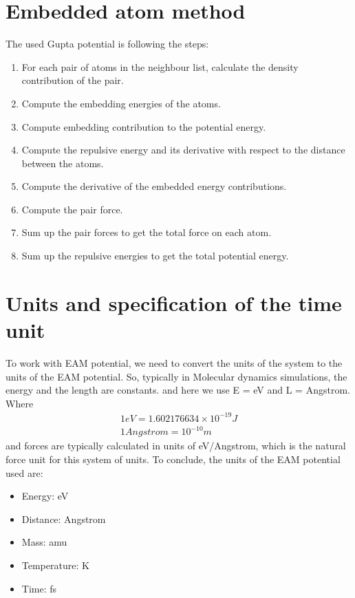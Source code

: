 \section{Embedded atom method}
The used Gupta potential \cite{gupta1981lattice} is following the steps:
    \begin{enumerate}
        \item For each pair of atoms in the neighbour list, calculate the density contribution of the pair.
        \item Compute the embedding energies of the atoms.
        \item Compute embedding contribution to the potential energy.
        \item Compute the repulsive energy and its derivative with respect to the distance between the atoms.
        \item Compute the derivative of the embedded energy contributions.
        \item Compute the pair force.
        \item Sum up the pair forces to get the total force on each atom.
        \item Sum up the repulsive energies to get the total potential energy.
        \end{enumerate}


\section{Units and specification of the time unit}
    To work with EAM potential, we need to convert the units of the system to the units of the EAM potential\cite{molDymCourse}. So, typically in Molecular dynamics simulations, the energy and the length are constants. and here we use E = eV and L = Angstrom. Where
    \begin{equation}
    \label{eq:units}
        \begin{aligned}
            1 eV = 1.602176634 \times 10^{-19} J \\
            1 Angstrom = 10^{-10} m
        \end{aligned}
    \end{equation}
    and forces are typically calculated in units of eV/Angstrom, which is the natural force unit for this system of units.
    To conclude, the units of the EAM potential used are:

    \begin{itemize}
        \item Energy: eV
        \item Distance: Angstrom
        \item Mass: amu
        \item Temperature: K
        \item Time: fs
    \end{itemize}

